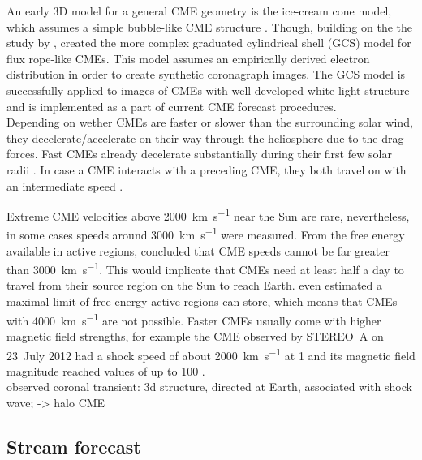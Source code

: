 An early 3D model for a general CME geometry is the ice-cream cone model, which assumes a simple bubble-like CME structure \citep{Fisher1984}. Though, building on the the study by \citet{Cremades2004}, \citet{Thernisien2006} created the more complex graduated cylindrical shell (GCS) model for flux rope-like CMEs. This model assumes an empirically derived electron distribution in order to create synthetic coronagraph images. The GCS model is successfully applied to images of CMEs with well-developed white-light structure \citep{Bosman2012} and is implemented as a part of current CME forecast procedures.\\



Depending on wether CMEs are faster or slower than the surrounding solar wind, they decelerate/accelerate on their way through the heliosphere due to the drag forces. Fast CMEs already decelerate substantially during their first few solar radii \citep{Sachdeva2017}. In case a CME interacts with a preceding CME, they both travel on with an intermediate speed \citep{Manoharan2004,Temmer2012}.

Extreme CME velocities above \SI{2000}{\km\per\s} near the Sun are rare, nevertheless, in some cases speeds around \SI{3000}{\km\per\s} were measured. From the free energy available in active regions, \citet{Gopalswamy2005} concluded that CME speeds cannot be far greater than \SI{3000}{\km\per\s}. This would implicate that CMEs need at least half a day to travel from their source region on the Sun to reach Earth. \citet{Gopalswamy2010} even estimated a maximal limit of free energy active regions can store, which means that CMEs with \SI{4000}{\km\per\s} are not possible. Faster CMEs usually come with higher magnetic field strengths, for example the CME observed by STEREO~A on 23~July 2012 had a shock speed of about \SI{2000}{\km\per\s} at \SI{1}{\au} and its magnetic field magnitude reached values of up to \SI{100}{\nT} \citep{Russell2013}.\\


observed coronal transient: 3d structure, directed at Earth, associated with shock wave; \citep{Howard1982} -> halo CME\\


\subsection{Stream forecast}

